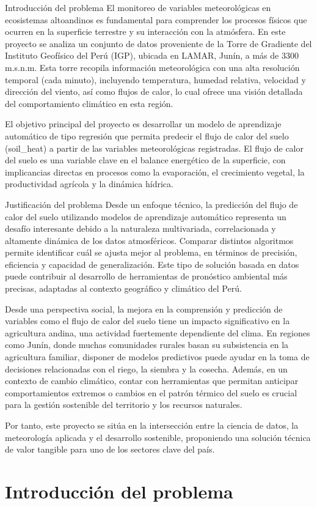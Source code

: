 
Introducción del problema
El monitoreo de variables meteorológicas en ecosistemas altoandinos es fundamental para comprender los procesos físicos que ocurren en la superficie terrestre y su interacción con la atmósfera. En este proyecto se analiza un conjunto de datos proveniente de la Torre de Gradiente del Instituto Geofísico del Perú (IGP), ubicada en LAMAR, Junín, a más de 3300 m.s.n.m. Esta torre recopila información meteorológica con una alta resolución temporal (cada minuto), incluyendo temperatura, humedad relativa, velocidad y dirección del viento, así como flujos de calor, lo cual ofrece una visión detallada del comportamiento climático en esta región.

El objetivo principal del proyecto es desarrollar un modelo de aprendizaje automático de tipo regresión que permita predecir el flujo de calor del suelo (soil_heat) a partir de las variables meteorológicas registradas. El flujo de calor del suelo es una variable clave en el balance energético de la superficie, con implicancias directas en procesos como la evaporación, el crecimiento vegetal, la productividad agrícola y la dinámica hídrica.

Justificación del problema
Desde un enfoque técnico, la predicción del flujo de calor del suelo utilizando modelos de aprendizaje automático representa un desafío interesante debido a la naturaleza multivariada, correlacionada y altamente dinámica de los datos atmosféricos. Comparar distintos algoritmos permite identificar cuál se ajusta mejor al problema, en términos de precisión, eficiencia y capacidad de generalización. Este tipo de solución basada en datos puede contribuir al desarrollo de herramientas de pronóstico ambiental más precisas, adaptadas al contexto geográfico y climático del Perú.

Desde una perspectiva social, la mejora en la comprensión y predicción de variables como el flujo de calor del suelo tiene un impacto significativo en la agricultura andina, una actividad fuertemente dependiente del clima. En regiones como Junín, donde muchas comunidades rurales basan su subsistencia en la agricultura familiar, disponer de modelos predictivos puede ayudar en la toma de decisiones relacionadas con el riego, la siembra y la cosecha. Además, en un contexto de cambio climático, contar con herramientas que permitan anticipar comportamientos extremos o cambios en el patrón térmico del suelo es crucial para la gestión sostenible del territorio y los recursos naturales.

Por tanto, este proyecto se sitúa en la intersección entre la ciencia de datos, la meteorología aplicada y el desarrollo sostenible, proponiendo una solución técnica de valor tangible para uno de los sectores clave del país.


\section{Introducción del problema}

